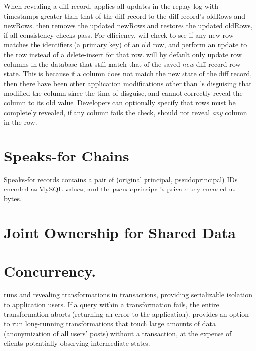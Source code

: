 %
When revealing a diff record, \sys applies all updates in the replay log with
timestamps greater than that of the diff record to the diff record's oldRows and
newRows.  \sys then removes the updated newRows and restores the updated
oldRows, if all consistency checks pass.
%
For efficiency, \sys will check to see if any new row matches the identifiers
(\eg a primary key) of an old row, and perform an update to the row instead of a
delete-insert for that row. \sys will by default only update row columns in the
database that still match that of the saved \emph{new} diff record row state.
This is because if a column does not match the new state of the diff record,
then there have been other application modifications other than \sys's
disguising that modified the column since the time of disguise, and \sys cannot
correctly reveal the column to its old value. Developers can optionally specify
that rows must be completely revealed, \ie if any column fails the check, \sys
should not reveal \emph{any} column in the row.
%

\section{Speaks-for Chains}

Speaks-for records contains a pair of (original principal, pseudoprincipal) IDs
encoded as MySQL values, and the pseudoprincipal’s private key encoded as bytes. 
%
\section{Joint Ownership for Shared Data}

%
\section{Concurrency.}
%
\sys runs \xxing and revealing transformations in transactions, providing
serializable isolation to application users.
%
If a query within a transformation fails, the entire transformation aborts
(returning an error to the application).
%
\sys provides an option to run long-running transformations that
touch large amounts of data (\eg anonymization of all users' posts) without a
transaction, at the expense of clients potentially observing intermediate
states.
%


